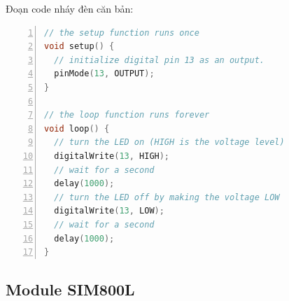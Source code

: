 Đoạn code nháy đèn căn bản:
\begin{lstlisting}[numbers=left,firstnumber=1,language=C]
// the setup function runs once
void setup() {
  // initialize digital pin 13 as an output.
  pinMode(13, OUTPUT);
}

// the loop function runs forever
void loop() {
  // turn the LED on (HIGH is the voltage level)
  digitalWrite(13, HIGH);   
  // wait for a second
  delay(1000);    
  // turn the LED off by making the voltage LOW          
  digitalWrite(13, LOW);    
  // wait for a second
  delay(1000);              
}

	\end{lstlisting}







\subsection{Module SIM800L}\label{sec:sim800l}
